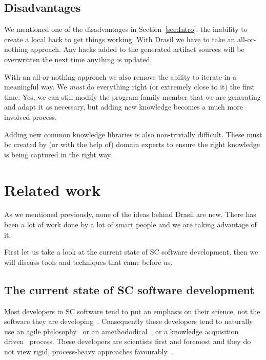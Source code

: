 \documentclass[preprint, 10pt]{sigplanconf}
\begin{document}
\subsection{Disadvantages}
\label{subsec:disadvantages}

We mentioned one of the disadvantages in Section~\ref{sec:Intro}: the inability
to create a local hack to get things working. With Drasil we have to take an
all-or-nothing approach. Any hacks added to the generated artifact sources will
be overwritten the next time anything is updated.

With an all-or-nothing approach we also remove the ability to iterate in a
meaningful way. We \emph{must} do everything right (or extremely close to it)
the first time. Yes, we can still modify the program family member that we are
generating and adapt it as necessary, but adding new knowledge becomes a much
more involved process.

Adding new common knowledge libraries is also non-trivially difficult. These
must be created by (or with the help of) domain experts to ensure the right
knowledge is being captured in the right way.

\section{Related work}
\label{sec:bg}

As we mentioned previously, none of the ideas behind Drasil are new. There has
been a lot of work done by a lot of smart people and we are taking advantage of
it. 


First let us take a look at the current state of SC software development, then
we will discuss tools and techniques that came before us. 

\subsection{The current state of SC software development}
\label{subsec:scdev}

Most developers in SC software tend to put an emphasis on their science, not the
software they are developing~\cite{Kelly}. %
Consequently these developers tend to naturally use an agile
philosophy~\cite{AckroydEtAl2008, CarverEtAl2007, EasterbrookAndJohns2009,
Segal2005} or an amethododical~\cite{Kelly2013}, or a knowledge acquisition
driven~\cite{Kelly2015} process. These developers are scientists first and
foremost and they do not view rigid, process-heavy approaches
favourably~\cite{CarverEtAl2007}.
\end{document}
